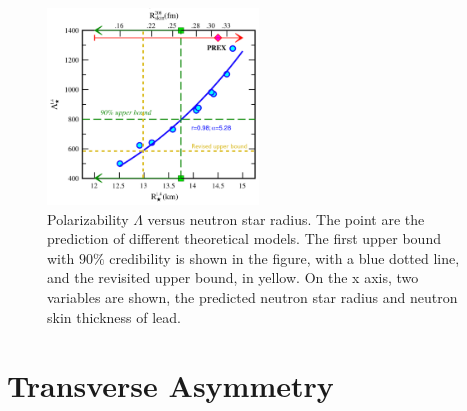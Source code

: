 \begin{figure}[!hbtp]
\centering
\includegraphics[width = 0.5\textwidth]{Introduzione/UpdatedPlot.png}
\caption{ Polarizability $\Lambda$ versus neutron star radius. The point are the prediction of different theoretical models. The first upper bound with $90 \%$ credibility is shown in the figure, with a blue dotted line, and the revisited upper bound, in yellow. On the x axis, two variables are shown, the predicted neutron star radius and neutron skin thickness of lead.}
\label{fig:NeutronSkinandLambda}
\end{figure}


\section{Transverse Asymmetry}

